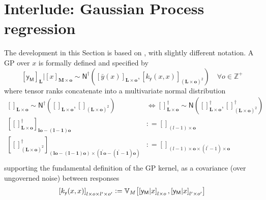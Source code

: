 \documentclass[preprint,12pt]{elsarticle}
\newcommand*{\M}[1]{\ensuremath{#1}\xspace}
\newcommand*{\x}{\times}
\newcommand*{\mi}[1]{\mathbf{#1}}
\newcommand*{\st}[1]{\mathbb{#1}}
\newcommand*{\rv}[1]{\mathsf{#1}}
\newcommand*{\te}[2][]{\left\lbrack{#2}\right\rbrack_{#1}}
\newcommand*{\deq}{\M{\mathrel{\mathop:}=}}
\newcommand*{\cov}[3][]{\ifthenelse{\equal{#1}{}}{\mathbb{V}_{#3}\!\left\lbrack{#2}\right\rbrack}{\mathbb{V}_{#3}\!\left\lbrack{#2,#1}\right\rbrack}}
\newcommand*{\gauss}[2]{\mathsf{N}\!\left({#1,#2}\right)}
\newcommand*{\gaussd}[2]{\mathsf{N}^{\dagger}\!\left({#1,#2}\right)}
\begin{document}
\section{Interlude: Gaussian Process regression} \label{sec:GPR}
    The development in this Section is based on \cite{Alvarez.etal2011}, with slightly different notation. A GP over $x$ is formally defined and specified by
    \begin{equation*}
        \te[\mi{L}]{\rv{y_M}} \big\vert \te[\mi{M}\x\mi{o}]{x} \sim 
        \gaussd{\te[\mi{L}\x\mi{o}]{\bar{y}(x)}}{\te[(\mi{L}\x\mi{o})^{2}]
        {k_{\rv{y}}(x,x)}} \quad \forall o \in \st{Z^{+}}
    \end{equation*}
    where tensor ranks concatenate into a multivariate normal distribution
    \begin{equation*}
        \begin{aligned}
            \te[\mi{L}\x\mi{o}]{} \sim \gaussd{\te[\mi{L}\x\mi{o}]{}}{\te[(\mi{L\x o})^{2}]{}}
            & \Longleftrightarrow
            \te[\mi{L}\x\mi{o}]{}^{\dagger} \sim \gauss{\te[\mi{L}\x\mi{o}]{}^{\dagger}}{\te[(\mi{L\x o})^{2}]{}^{\dagger}} \\
            \te[\mi{lo}-\mi{(l-1)o}]{\te[\mi{L}\x\mi{o}]{}^{\dagger}} 
            &\deq \te[(l-1)\x\mi{o}]{} \\
            \te[(\mi{lo}-(\mi{l-1})\mi{o}) \x (\mi{l^{\prime}o}-\mi{(l^{\prime}-1)o})]
            {\te[(\mi{L\x o})^{2}]{}^{\dagger}} 
            &\deq \te[(l-1)\x\mi{o} \x (l^{\prime}-1)\x\mi{o}]{} \\
        \end{aligned}
    \end{equation*}
    supporting the fundamental definition of the GP kernel, as a covariance (over ungoverned noise) between responses
    \begin{equation*}
        \te[l\x o\x l^{\prime}\x o^{\prime}]{k_{\rv{y}}(x,x)} 
        \deq \cov[{\te[l^{\prime}\x o^{\prime}]{\rv{y_M}\vert x}}]{\te[l\x o]{\rv{y_M}\vert x}}{M}
    \end{equation*}
\end{document}
